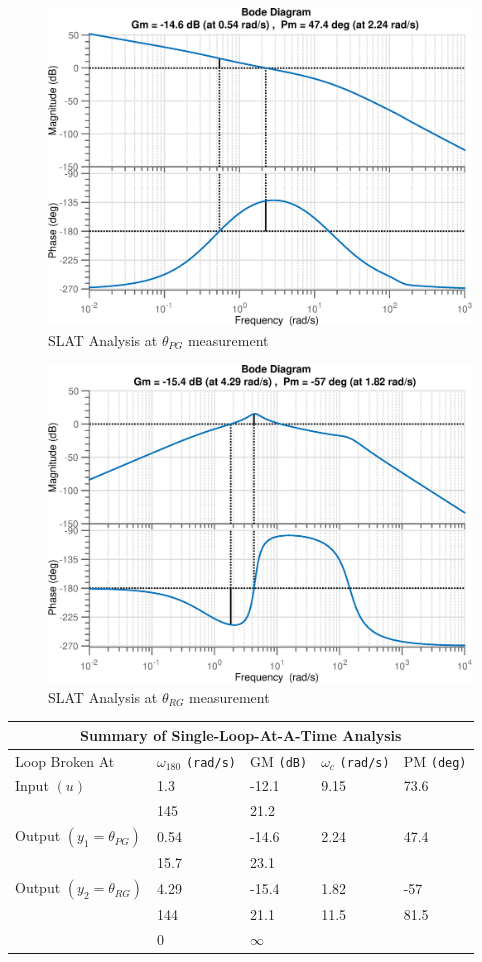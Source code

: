 \documentclass[12pt]{article}
\begin{document}
	\begin{figure}[H]
		\centering
		\includegraphics[width=0.8\linewidth]{InputLoopBode_SLAT_Y1}
		\caption{SLAT Analysis at $\theta_{PG}$ measurement}
		\label{fig:inputloopbodeslaty1}
	\end{figure}
	
	\begin{figure}[H]
		\centering
		\includegraphics[width=0.8\linewidth]{InputLoopBode_SLAT_Y2}
		\caption{SLAT Analysis at $\theta_{RG}$ measurement}
		\label{fig:inputloopbodeslaty2}
	\end{figure}
	
	\begin{center}
		\begin{tabular}{ |p{3.5cm}|p{2.4cm}|p{2.2cm}|p{2.2cm}|p{2.2cm}|  }
			\hline
			\multicolumn{5}{|c|}{Summary of Single-Loop-At-A-Time Analysis} \\
			\hline
			Loop Broken At & $\omega_{180}$ \texttt{(rad/s)}& GM \texttt{(dB)}& $\omega_c$ \texttt{(rad/s)}& PM \texttt{(deg)} \\
			\hline
			Input $(u)$ & 1.3 & -12.1 & 9.15 & 73.6\\
			& 145 & 21.2 & &\\
			\hline
			Output $(y_1=\theta_{PG})$ & 0.54 & -14.6  & 2.24 & 47.4\\
			& 15.7 & 23.1 & &\\
			\hline
			Output $(y_2=\theta_{RG})$ & 4.29 & -15.4 & 1.82 & -57\\
			& 144 & 21.1 & 11.5 & 81.5\\
			& 0 & $\infty$ & &\\
			\hline
		\end{tabular}
	\end{center}
	
\end{document}
